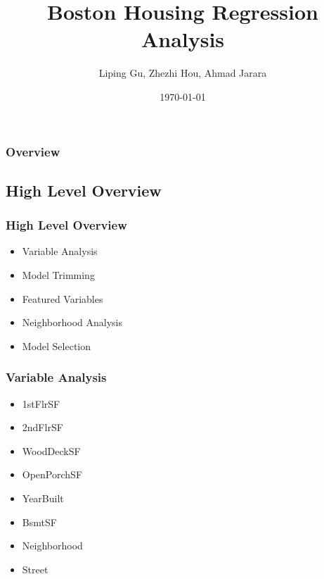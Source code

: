 \documentclass{beamer}
\title[BHD]{Boston Housing Regression Analysis} %
\author{Liping Gu, Zhezhi Hou, Ahmad Jarara} %
\institute[BU] %
{
Binghamton University \\ %
\medskip
}
\date{\today} %
\begin{document}
\begin{frame}
\titlepage %
\end{frame}

\begin{frame}
\frametitle{Overview} %
\tableofcontents %
\end{frame}

\begin{frame}
\section{High Level Overview}
\frametitle{High Level Overview}
\begin{itemize}
\item Variable Analysis
\item Model Trimming
\item Featured Variables
\item Neighborhood Analysis
\item Model Selection
\end{itemize}
\end{frame}


\begin{frame}
\frametitle{Variable Analysis}
\begin{itemize}
\item 1stFlrSF
\item 2ndFlrSF
\item WoodDeckSF
\item OpenPorchSF
\item YearBuilt
\item BsmtSF
\item Neighborhood
\item Street
\end{itemize}
\end{frame}
\end{document}
